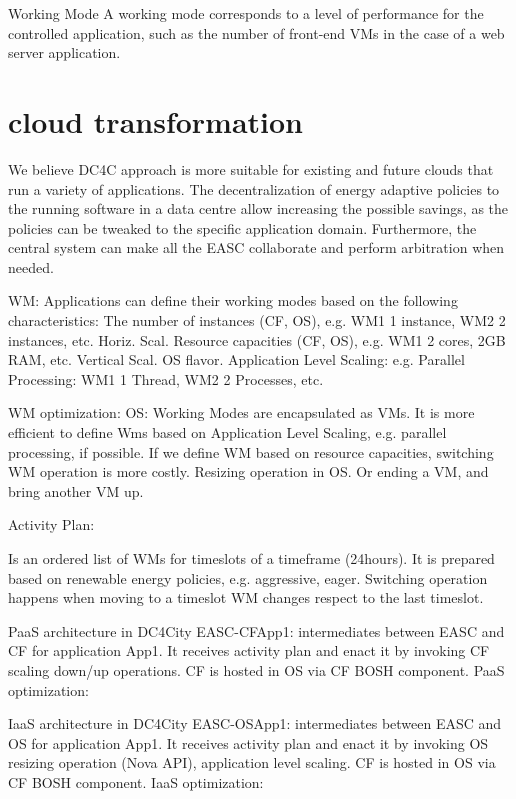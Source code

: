 Working Mode
A working mode corresponds to a level of performance for the controlled application, such as the number of front-end VMs in the case of a web server application.

\section{cloud transformation}
We believe DC4C approach is more suitable for existing and future clouds that run a variety of applications. The decentralization of energy adaptive policies to the running software in a data centre allow increasing the possible savings, as the policies can be tweaked to the specific application domain. Furthermore, the central system can make all the EASC collaborate and perform arbitration when needed.

WM:
Applications can define their working modes based on the following characteristics:
The number of instances (CF, OS), e.g. WM1 1 instance, WM2 2 instances, etc. Horiz. Scal.
Resource capacities (CF, OS), e.g. WM1 2 cores, 2GB RAM, etc. Vertical Scal. OS flavor.
Application Level Scaling: e.g. Parallel Processing: WM1 1 Thread, WM2 2 Processes, etc.

WM optimization:
OS: Working Modes are encapsulated as VMs.
It is more efficient to define Wms based on Application Level Scaling, e.g. parallel processing, if possible.
If we define WM based on resource capacities,  switching WM operation is more costly.
Resizing operation in OS.
Or ending a VM, and bring another VM up.

Activity Plan:

Is an ordered list of WMs for timeslots of a timeframe (24hours).
It is prepared based on renewable energy policies, e.g. aggressive, eager.
Switching operation happens when moving to a timeslot WM changes respect to the last timeslot.

PaaS architecture in DC4City
EASC-CFApp1: intermediates between EASC and CF for application App1. It receives activity plan and enact it by invoking CF scaling down/up operations.
CF is hosted in OS via CF BOSH component.
PaaS optimization:

IaaS architecture in DC4City
EASC-OSApp1: intermediates between EASC and OS for application App1. It receives activity plan and enact it by invoking OS resizing operation (Nova API), application level scaling.
CF is hosted in OS via CF BOSH component.
IaaS optimization: